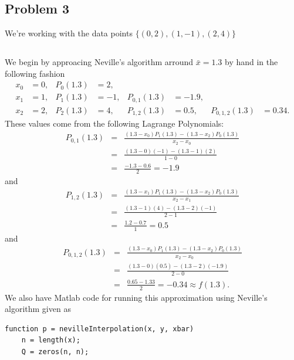 \documentclass[12pt]{amsart}
\begin{document}
\begin{onehalfspace}
        \section{Problem 3}
        We're working with the data points $\{(0,2), (1,-1), (2,4)\}$

        \subsection{}
        We begin by approacing Neville's algorithm arround $\bar{x}=1.3$ by hand in the following fashion
        \begin{align*}
            x_0 &= 0, & P_0(1.3) &= 2, & & \\
            x_1 &= 1, & P_1(1.3) &= -1, & P_{0,1}(1.3) &= -1.9, & \\
            x_2 &= 2, & P_2(1.3) &= 4, & P_{1,2}(1.3) &= 0.5, & P_{0,1,2}(1.3) &= 0.34.
        \end{align*}
        These values come from the following Lagrange Polynomials:
        \begin{eqnarray*}
            P_{0,1}(1.3) & = & \frac{(1.3 - x_0)P_1(1.3) - (1.3-x_2)P_0(1.3)}{x_2-x_0} \\
            & = & \frac{(1.3-0)(-1) - (1.3 - 1)(2)}{1-0}\\
            & = & \frac{-1.3 - 0.6}{2} = -1.9
        \end{eqnarray*}
        and
        \begin{eqnarray*}
            P_{1,2}(1.3) & = & \frac{(1.3 - x_1)P_1(1.3) - (1.3-x_2)P_0(1.3)}{x_2-x_1}\\
            & = & \frac{(1.3-1)(4) - (1.3-2)(-1)}{2-1}\\
            & = & \frac{1.2 - 0.7}{1} = 0.5
        \end{eqnarray*}
        and
        \begin{eqnarray*}
            P_{0,1,2}(1.3) & = & \frac{(1.3 - x_0)P_1(1.3) - (1.3-x_2)P_0(1.3)}{x_2-x_0} \\
            & = & \frac{(1.3-0)(0.5) - (1.3 - 2)(-1.9)}{2 - 0}\\
            & = & \frac{0.65-1.33}{2} = -0.34 \approx f(1.3).
        \end{eqnarray*}
        We also have Matlab code for running this approximation using Neville's algorithm given as
        \begin{tiny}
        \begin{verbatim}
function p = nevilleInterpolation(x, y, xbar)
    n = length(x);
    Q = zeros(n, n);


\end{verbatim}
\end{tiny}
\end{onehalfspace}
\end{document}
